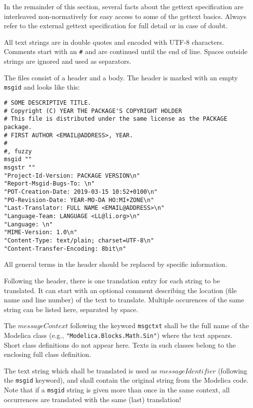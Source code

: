 \begin{nonnormative}
In the remainder of this section, several facts about the gettext specification are interleaved non-normatively for easy access to some of the gettext basics.
Always refer to the external gettext specification for full detail or in case of doubt.

All text strings are in double quotes and encoded with UTF-8 characters.
Comments start with an \lstinline!#! and are continued until the end of line.
Spaces outside strings are ignored and used as separators.

The files consist of a header and a body.
The header is marked with an empty \lstinline!msgid! and looks like this:
\begin{lstlisting}
# SOME DESCRIPTIVE TITLE.
# Copyright (C) YEAR THE PACKAGE'S COPYRIGHT HOLDER
# This file is distributed under the same license as the PACKAGE package.
# FIRST AUTHOR <EMAIL@ADDRESS>, YEAR.
#
#, fuzzy
msgid ""
msgstr ""
"Project-Id-Version: PACKAGE VERSION\n"
"Report-Msgid-Bugs-To: \n"
"POT-Creation-Date: 2019-03-15 10:52+0100\n"
"PO-Revision-Date: YEAR-MO-DA HO:MI+ZONE\n"
"Last-Translator: FULL NAME <EMAIL@ADDRESS>\n"
"Language-Team: LANGUAGE <LL@li.org>\n"
"Language: \n"
"MIME-Version: 1.0\n"
"Content-Type: text/plain; charset=UTF-8\n"
"Content-Transfer-Encoding: 8bit\n"
\end{lstlisting}
All general terms in the header should be replaced by specific information.

Following the header, there is one translation entry for each string to be translated.
It can start with an optional comment describing the location (file name and line number) of the text to translate.
Multiple occurences of the same string can be listed here, separated by space.
\end{nonnormative}

The $\mathit{messageContext}$ following the keyword \lstinline!msgctxt! shall be the full name of the Modelica class (e.g., \lstinline!"Modelica.Blocks.Math.Sin"!) where the text appears.
Short class definitions do not appear here.
Texts in such classes belong to the enclosing full class definition.

The text string which shall be translated is used as $\mathit{messageIdentifier}$ (following the \lstinline!msgid! keyword), and shall contain the original string from the Modelica code.
Note that if a \lstinline!msgid! string is given more than once in the same context, all occurrences are translated with the same (last) translation!

